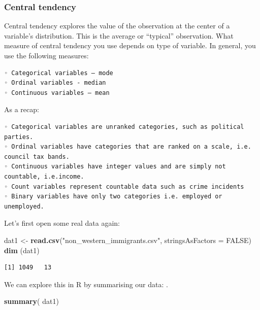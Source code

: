 \documentclass[]{article}
\newenvironment{Shaded}{\begin{snugshade}}{\end{snugshade}}
\newcommand{\DataTypeTok}[1]{\textcolor[rgb]{0.13,0.29,0.53}{#1}}
\newcommand{\KeywordTok}[1]{\textcolor[rgb]{0.13,0.29,0.53}{\textbf{#1}}}
\newcommand{\NormalTok}[1]{#1}
\newcommand{\OtherTok}[1]{\textcolor[rgb]{0.56,0.35,0.01}{#1}}
\newcommand{\StringTok}[1]{\textcolor[rgb]{0.31,0.60,0.02}{#1}}
\begin{document}
\hypertarget{central-tendency}{%
\subsubsection{Central tendency}\label{central-tendency}}

Central tendency explores the value of the observation at the center of a variable's distribution. This is the average or ``typical'' observation. What measure of central tendency you use depends on type of variable. In general, you use the following measures:

\begin{verbatim}
◦ Categorical variables – mode
◦ Ordinal variables - median
◦ Continuous variables – mean
\end{verbatim}

As a recap:

\begin{verbatim}
◦ Categorical variables are unranked categories, such as political parties.
◦ Ordinal variables have categories that are ranked on a scale, i.e. council tax bands.
◦ Continuous variables have integer values and are simply not countable, i.e.income.
◦ Count variables represent countable data such as crime incidents
◦ Binary variables have only two categories i.e. employed or unemployed.
\end{verbatim}

Let's first open some real data again:

\begin{Shaded}
\begin{Highlighting}[]
\NormalTok{dat1 <-}\StringTok{ }\KeywordTok{read.csv}\NormalTok{(}\StringTok{"non_western_immigrants.csv"}\NormalTok{, }\DataTypeTok{stringsAsFactors =} \OtherTok{FALSE}\NormalTok{)}
\KeywordTok{dim}\NormalTok{ (dat1)}
\end{Highlighting}
\end{Shaded}

\begin{verbatim}
[1] 1049   13
\end{verbatim}

We can explore this in R by summarising our data:
.

\begin{Shaded}
\begin{Highlighting}[]
\KeywordTok{summary}\NormalTok{( dat1)}
\end{Highlighting}
\end{Shaded}
\end{document}
